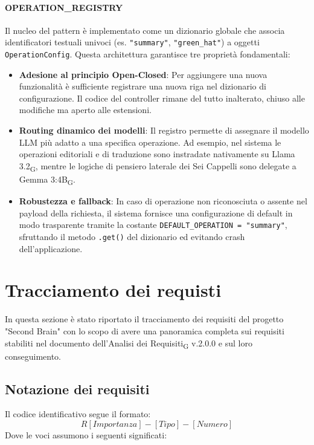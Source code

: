 \documentclass[11pt,a4paper]{article}
\newcommand{\gls}[1]{#1\textsubscript{G}}
\begin{document}
\paragraph{OPERATION\_REGISTRY}
Il nucleo del pattern è implementato come un dizionario globale che associa identificatori testuali univoci (es. \texttt{"summary"}, \texttt{"green\_hat"}) a oggetti \texttt{OperationConfig}. Questa architettura garantisce tre proprietà fondamentali:
\begin{itemize}
    \item \textbf{Adesione al principio Open-Closed}: Per aggiungere una nuova funzionalità è sufficiente registrare una nuova riga nel dizionario di configurazione. Il codice del controller rimane del tutto inalterato, chiuso alle modifiche ma aperto alle estensioni.
    \item \textbf{Routing dinamico dei modelli}: Il registro permette di assegnare il modello LLM più adatto a una specifica operazione. Ad esempio, nel sistema le operazioni editoriali e di traduzione sono instradate nativamente su \gls{Llama 3.2}, mentre le logiche di pensiero laterale dei Sei Cappelli sono delegate a \gls{Gemma 3:4B}.
    \item \textbf{Robustezza e fallback}: In caso di operazione non riconosciuta o assente nel payload della richiesta, il sistema fornisce una configurazione di default in modo trasparente tramite la costante \texttt{DEFAULT\_OPERATION = "summary"}, sfruttando il metodo \texttt{.get()} del dizionario ed evitando crash dell'applicazione.
\end{itemize}



\newpage

\section{Tracciamento dei requisti}
In questa sezione è stato riportato il tracciamento dei requisiti del progetto "Second Brain" con lo scopo di avere una panoramica completa sui requisiti stabiliti nel documento dell'\gls{Analisi dei Requisiti} v.2.0.0 e sul loro conseguimento.

\subsection{Notazione dei requisiti}
Il codice identificativo segue il formato:
\[
R[Importanza]-[Tipo]-[Numero]
\]
Dove le voci assumono i seguenti significati:
\end{document}
